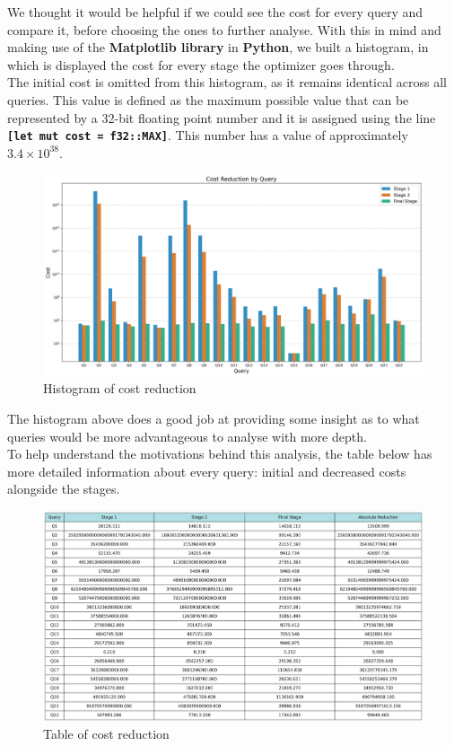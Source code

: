 \documentclass[a4paper,12pt]{scrreprt}
\begin{document}
We thought it would be helpful if we could see the cost for every query and compare it, before choosing the ones to further analyse. With this in mind and making use of the \textbf{Matplotlib library} in \textbf{Python}, we built a histogram, in which is displayed the cost for every stage the optimizer goes through. \\

The initial cost is omitted from this histogram, as it remains identical across all queries.
This value is defined as the maximum possible value that can be represented by a 32-bit floating point number and it is assigned using the line \textbf{\texttt{[let mut cost = f32::MAX]}}. This number has a value of approximately $3.4 \times 10^{38}$.

\begin{figure}[H]
    \includegraphics[width = 1.35\textwidth, height = 0.37\textheight, keepaspectratio]{img_cost_differential/cost_reduction_all_queries.png}
    \caption{Histogram of cost reduction}
    \label{fig:cost1}
\end{figure}

The histogram above does a good job at providing some insight as to what queries would be more advantageous to analyse with more depth. \\

To help understand the motivations behind this analysis, the table below has more detailed information about every query: initial and decreased costs alongside the stages.

\begin{figure}[H]
    \includegraphics[width = 1.45\textwidth, height = 0.40\textheight, keepaspectratio]{img_cost_differential/cost_reduction_table.png}
    \caption{Table of cost reduction}
    \label{fig:tab1}
\end{figure}
\end{document}
